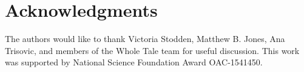 \section{Acknowledgments}\label{sec-acknowledgments}

The authors would like to thank Victoria Stodden, Matthew B. Jones,
Ana Trisovic, and members of the Whole Tale team for useful discussion.
This work was supported by National Science Foundation Award OAC-1541450.

